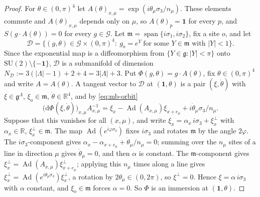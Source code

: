 \documentclass[11pt,a4paper]{amsart}
\theoremstyle{definition}
\theoremstyle{remark}
\numberwithin{equation}{section}
\newcommand{\R}{\mathbb{R}}          %
\newcommand{\abs}[1]{\lvert #1\rvert}      %
\newcommand{\SU}{\mathrm{SU}}              %
\begin{document}
\begin{proof}
For $\theta\in(0,\pi)^4$ let $A(\theta)_{x,\mu}=\exp(i\theta_\mu\sigma_3/n_\mu)$. These elements commute and $A(\theta)_{x,\mu}$ depends only on $\mu$, so $A(\theta)_p=\mathbf 1$ for every $p$, and $S(g\cdot A(\theta))=0$ for every $g\in\mathcal G$. Let $\mathfrak m=\operatorname{span}\{i\sigma_1,i\sigma_2\}$, fix a site $o$, and let
\[
\mathcal D=\bigl\{(g,\theta)\in\mathcal G\times(0,\pi)^4:\ g_o=e^Y\ \text{for some }Y\in\mathfrak m\text{ with }\abs Y<1\bigr\}.
\]
Since the exponential map is a diffeomorphism from $\{Y\in\mathfrak g:\abs Y<\pi\}$ onto $\SU(2)\setminus\{-\mathbf 1\}$, $\mathcal D$ is a submanifold of dimension $N_{\mathcal D}:=3(\abs\Lambda-1)+2+4=3\abs\Lambda+3$. Put $\Phi(g,\theta)=g\cdot A(\theta)$, fix $\theta\in(0,\pi)^4$ and write $A=A(\theta)$. A tangent vector to $\mathcal D$ at $(\mathbf 1,\theta)$ is a pair $(\xi,\dot\theta)$ with $\xi\in\mathfrak g^\Lambda$, $\xi_o\in\mathfrak m$, $\dot\theta\in\R^4$, and by \eqref{eq:mb-orbit}
\[
\bigl(\mathrm d\Phi(\xi,\dot\theta)\bigr)_{x,\mu}A_{x,\mu}^{-1}=\xi_x-\operatorname{Ad}(A_{x,\mu})\xi_{x+e_\mu}+i\dot\theta_\mu\sigma_3/n_\mu .
\]
Suppose that this vanishes for all $(x,\mu)$, and write $\xi_x=\alpha_x\,i\sigma_3+\xi^\perp_x$ with $\alpha_x\in\R$, $\xi^\perp_x\in\mathfrak m$. The map $\operatorname{Ad}(e^{i\varphi\sigma_3})$ fixes $i\sigma_3$ and rotates $\mathfrak m$ by the angle $2\varphi$. The $i\sigma_3$-component gives $\alpha_x-\alpha_{x+e_\mu}+\dot\theta_\mu/n_\mu=0$; summing over the $n_\mu$ sites of a line in direction $\mu$ gives $\dot\theta_\mu=0$, and then $\alpha$ is constant. The $\mathfrak m$-component gives $\xi^\perp_x=\operatorname{Ad}(A_{x,\mu})\xi^\perp_{x+e_\mu}$; applying this $n_\mu$ times along a line gives $\xi^\perp_x=\operatorname{Ad}(e^{i\theta_\mu\sigma_3})\xi^\perp_x$, a rotation by $2\theta_\mu\in(0,2\pi)$, so $\xi^\perp=0$. Hence $\xi=\alpha\,i\sigma_3$ with $\alpha$ constant, and $\xi_o\in\mathfrak m$ forces $\alpha=0$. So $\Phi$ is an immersion at $(\mathbf 1,\theta)$.


\end{proof}
\end{document}
